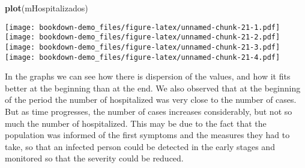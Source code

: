 \documentclass[
]{book}
\newenvironment{Shaded}{\begin{snugshade}}{\end{snugshade}}
\newcommand{\DataTypeTok}[1]{\textcolor[rgb]{0.13,0.29,0.53}{#1}}
\newcommand{\DecValTok}[1]{\textcolor[rgb]{0.00,0.00,0.81}{#1}}
\newcommand{\KeywordTok}[1]{\textcolor[rgb]{0.13,0.29,0.53}{\textbf{#1}}}
\newcommand{\NormalTok}[1]{#1}
\newcommand{\OperatorTok}[1]{\textcolor[rgb]{0.81,0.36,0.00}{\textbf{#1}}}
\newcommand{\StringTok}[1]{\textcolor[rgb]{0.31,0.60,0.02}{#1}}
\begin{document}
\begin{Shaded}
\begin{Highlighting}[]
\KeywordTok{plot}\NormalTok{(mHospitalizados)}
\end{Highlighting}
\end{Shaded}

\texttt{[image: bookdown-demo\_files/figure-latex/unnamed-chunk-21-1.pdf]} \texttt{[image: bookdown-demo\_files/figure-latex/unnamed-chunk-21-2.pdf]} \texttt{[image: bookdown-demo\_files/figure-latex/unnamed-chunk-21-3.pdf]} \texttt{[image: bookdown-demo\_files/figure-latex/unnamed-chunk-21-4.pdf]}

In the graphs we can see how there is dispersion of the values, and how it fits better at the beginning than at the end.
We also observed that at the beginning of the period the number of hospitalized was very close to the number of cases. But as time progresses, the number of cases increases considerably, but not so much the number of hospitalized. This may be due to the fact that the population was informed of the first symptoms and the measures they had to take, so that an infected person could be detected in the early stages and monitored so that the severity could be reduced.

\begin{Shaded}
\end{Shaded}
\end{document}
